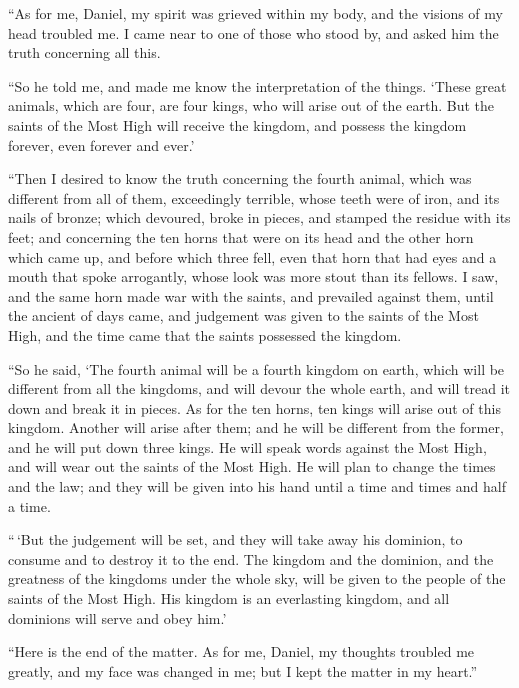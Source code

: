  ``As for me, Daniel, my spirit was grieved within my
body, and the visions of my head troubled me.  I came
near to one of those who stood by, and asked him the truth concerning
all this.

``So he told me, and made me know the interpretation of the things.
 `These great animals, which are four, are four kings,
who will arise out of the earth.  But the saints of the
Most High will receive the kingdom, and possess the kingdom forever,
even forever and ever.'

 ``Then I desired to know the truth concerning the fourth
animal, which was different from all of them, exceedingly terrible,
whose teeth were of iron, and its nails of bronze; which devoured, broke
in pieces, and stamped the residue with its feet;  and
concerning the ten horns that were on its head and the other horn which
came up, and before which three fell, even that horn that had eyes and a
mouth that spoke arrogantly, whose look was more stout than its fellows.
 I saw, and the same horn made war with the saints, and
prevailed against them,  until the ancient of days came,
and judgement was given to the saints of the Most High, and the time
came that the saints possessed the kingdom.

 ``So he said, `The fourth animal will be a fourth
kingdom on earth, which will be different from all the kingdoms, and
will devour the whole earth, and will tread it down and break it in
pieces.  As for the ten horns, ten kings will arise out
of this kingdom. Another will arise after them; and he will be different
from the former, and he will put down three kings.  He
will speak words against the Most High, and will wear out the saints of
the Most High. He will plan to change the times and the law; and they
will be given into his hand until a time and times and half a time.

 ``\,`But the judgement will be set, and they will take
away his dominion, to consume and to destroy it to the end.
 The kingdom and the dominion, and the greatness of the
kingdoms under the whole sky, will be given to the people of the saints
of the Most High. His kingdom is an everlasting kingdom, and all
dominions will serve and obey him.'

 ``Here is the end of the matter. As for me, Daniel, my
thoughts troubled me greatly, and my face was changed in me; but I kept
the matter in my heart.''

